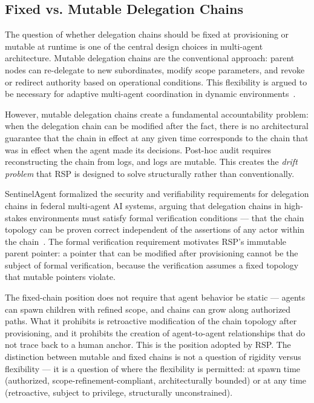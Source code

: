 \subsection{Fixed vs. Mutable Delegation Chains}

The question of whether delegation chains should be fixed at provisioning or mutable at runtime is one of the central design choices in multi-agent architecture. Mutable delegation chains are the conventional approach: parent nodes can re-delegate to new subordinates, modify scope parameters, and revoke or redirect authority based on operational conditions. This flexibility is argued to be necessary for adaptive multi-agent coordination in dynamic environments~\citep{wooldridge2009multiagent}.

However, mutable delegation chains create a fundamental accountability problem: when the delegation chain can be modified after the fact, there is no architectural guarantee that the chain in effect at any given time corresponds to the chain that was in effect when the agent made its decisions. Post-hoc audit requires reconstructing the chain from logs, and logs are mutable. This creates the \textit{drift problem} that RSP is designed to solve structurally rather than conventionally.

SentinelAgent formalized the security and verifiability requirements for delegation chains in federal multi-agent AI systems, arguing that delegation chains in high-stakes environments must satisfy formal verification conditions — that the chain topology can be proven correct independent of the assertions of any actor within the chain~\citep{sentinelagent}. The formal verification requirement motivates RSP's immutable parent pointer: a pointer that can be modified after provisioning cannot be the subject of formal verification, because the verification assumes a fixed topology that mutable pointers violate.

The fixed-chain position does not require that agent behavior be static — agents can spawn children with refined scope, and chains can grow along authorized paths. What it prohibits is retroactive modification of the chain topology after provisioning, and it prohibits the creation of agent-to-agent relationships that do not trace back to a human anchor. This is the position adopted by RSP. The distinction between mutable and fixed chains is not a question of rigidity versus flexibility — it is a question of where the flexibility is permitted: at spawn time (authorized, scope-refinement-compliant, architecturally bounded) or at any time (retroactive, subject to privilege, structurally unconstrained).

